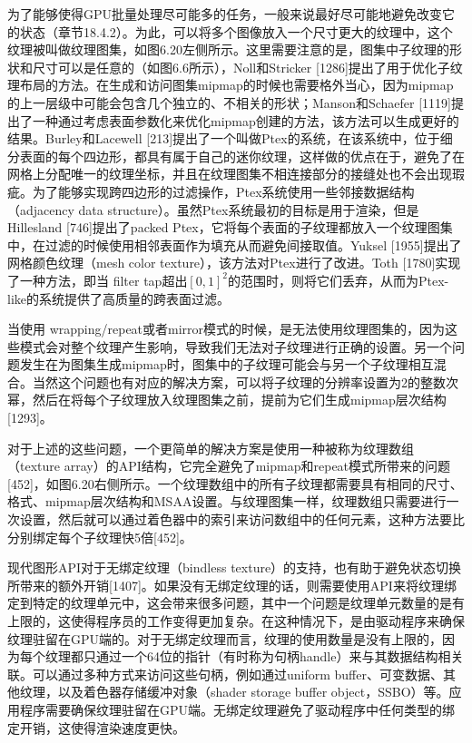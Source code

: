 \documentclass[
  paper=a4,
  ,captions=tableheading
]{scrartcl}
\begin{document}
为了能够使得GPU批量处理尽可能多的任务，一般来说最好尽可能地避免改变它的状态（章节18.4.2）。为此，可以将多个图像放入一个尺寸更大的纹理中，这个纹理被叫做纹理图集，如图6.20左侧所示。这里需要注意的是，图集中子纹理的形状和尺寸可以是任意的（如图6.6所示），Noll和Stricker
{[}1286{]}提出了用于优化子纹理布局的方法。在生成和访问图集mipmap的时候也需要格外当心，因为mipmap的上一层级中可能会包含几个独立的、不相关的形状；Manson和Schaefer
{[}1119{]}提出了一种通过考虑表面参数化来优化mipmap创建的方法，该方法可以生成更好的结果。Burley和Lacewell
{[}213{]}提出了一个叫做Ptex的系统，在该系统中，位于细分表面的每个四边形，都具有属于自己的迷你纹理，这样做的优点在于，避免了在网格上分配唯一的纹理坐标，并且在纹理图集不相连接部分的接缝处也不会出现瑕疵。为了能够实现跨四边形的过滤操作，Ptex系统使用一些邻接数据结构（adjacency
data structure）。虽然Ptex系统最初的目标是用于渲染，但是Hillesland
{[}746{]}提出了packed
Ptex，它将每个表面的子纹理都放入一个纹理图集中，在过滤的时候使用相邻表面作为填充从而避免间接取值。Yuksel
{[}1955{]}提出了网格颜色纹理（mesh color
texture），该方法对Ptex进行了改进。Toth {[}1780{]}实现了一种方法，即当
filter
tap超出\([0,1]^2\)的范围时，则将它们丢弃，从而为Ptex-like的系统提供了高质量的跨表面过滤。

当使用
wrapping/repeat或者mirror模式的时候，是无法使用纹理图集的，因为这些模式会对整个纹理产生影响，导致我们无法对子纹理进行正确的设置。另一个问题发生在为图集生成mipmap时，图集中的子纹理可能会与另一个子纹理相互混合。当然这个问题也有对应的解决方案，可以将子纹理的分辨率设置为2的整数次幂，然后在将每个子纹理放入纹理图集之前，提前为它们生成mipmap层次结构{[}1293{]}。

对于上述的这些问题，一个更简单的解决方案是使用一种被称为纹理数组（texture
array）的API结构，它完全避免了mipmap和repeat模式所带来的问题{[}452{]}，如图6.20右侧所示。一个纹理数组中的所有子纹理都需要具有相同的尺寸、格式、mipmap层次结构和MSAA设置。与纹理图集一样，纹理数组只需要进行一次设置，然后就可以通过着色器中的索引来访问数组中的任何元素，这种方法要比分别绑定每个子纹理快5倍{[}452{]}。

现代图形API对于无绑定纹理（bindless
texture）的支持，也有助于避免状态切换所带来的额外开销{[}1407{]}。如果没有无绑定纹理的话，则需要使用API来将纹理绑定到特定的纹理单元中，这会带来很多问题，其中一个问题是纹理单元数量的是有上限的，这使得程序员的工作变得更加复杂。在这种情况下，是由驱动程序来确保纹理驻留在GPU端的。对于无绑定纹理而言，纹理的使用数量是没有上限的，因为每个纹理都只通过一个64位的指针（有时称为句柄handle）来与其数据结构相关联。可以通过多种方式来访问这些句柄，例如通过uniform
buffer、可变数据、其他纹理，以及着色器存储缓冲对象（shader storage
buffer
object，SSBO）等。应用程序需要确保纹理驻留在GPU端。无绑定纹理避免了驱动程序中任何类型的绑定开销，这使得渲染速度更快。
\end{document}
